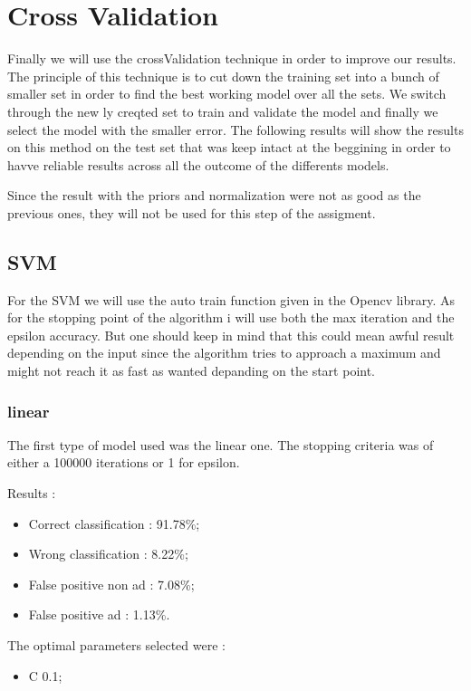 \section{Cross Validation}

Finally we will use the crossValidation technique in order to improve our results. The principle of this technique is to cut down the training set into a bunch of smaller set in order to find the best working model over all the sets. We switch through the new ly creqted set to train and validate the model and finally we select the model with the smaller error. The following results will show the results on this method on the test set that was keep intact at the beggining in order to havve reliable results across all the outcome of the differents models.

Since the result with the priors and normalization were not as good as the previous ones, they will not be used for this step of the assigment.

\subsection{SVM}

For the SVM we will use the auto train function given in the Opencv library. As for the stopping point of the algorithm i will use both the max iteration and the epsilon accuracy. But one should keep in mind that this could mean awful result depending on the input since the algorithm tries to approach a maximum and might not reach it as fast as wanted depanding on the start point.

\subsubsection{linear}

The first type of model used was the linear one. The stopping criteria was of either a 100000 iterations or 1 for epsilon.

Results :
\begin{itemize}
  \item Correct classification : 91.78\%;
  \item Wrong classification : 8.22\%;
  \item False positive non ad : 7.08\%;
  \item False positive ad : 1.13\%.
\end{itemize}

The optimal parameters selected were :
\begin{itemize}
  \item C 0.1;
\end{itemize}

